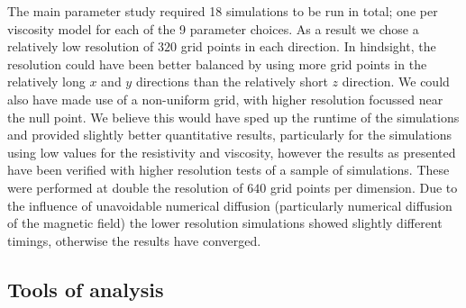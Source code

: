 The main parameter study required 18 simulations to be run in total; one per viscosity model for each of the 9 parameter choices. As a result we chose a relatively low resolution of $320$ grid points in each direction. In hindsight, the resolution could have been better balanced by using more grid points in the relatively long $x$ and $y$ directions than the relatively short $z$ direction. We could also have made use of a non-uniform grid, with higher resolution focussed near the null point. We believe this would have sped up the runtime of the simulations and provided slightly better quantitative results, particularly for the simulations using low values for the resistivity and viscosity, however the results as presented have been verified with higher resolution tests of a sample of simulations. These were performed at double the resolution of $640$ grid points per dimension. Due to the influence of unavoidable numerical diffusion (particularly numerical diffusion of the magnetic field) the lower resolution simulations showed slightly different timings, otherwise the results have converged.

\subsection{Tools of analysis}

